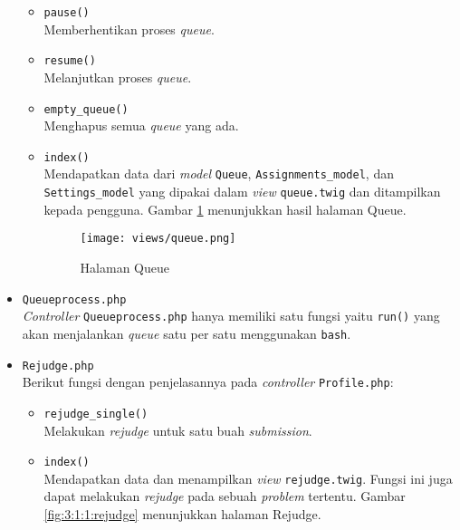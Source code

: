 \begin{itemize}
	      \begin{itemize}
		      \item \verb|pause()| \\
		            Memberhentikan proses \textit{queue}.
		      \item \verb|resume()| \\
		            Melanjutkan proses \textit{queue}.
		      \item \verb|empty_queue()| \\
		            Menghapus semua \textit{queue} yang ada.
		      \item \verb|index()| \\
		            Mendapatkan data dari \textit{model} \verb|Queue|, \verb|Assignments_model|, dan \verb|Settings_model| yang dipakai dalam \textit{view} \verb|queue.twig| dan ditampilkan kepada pengguna. Gambar \ref{fig:3:1:1:queue} menunjukkan hasil halaman Queue.

		            \begin{figure}[H]
			            \centering
			            \texttt{[image: views/queue.png]}
			            \caption{Halaman Queue}
			            \label{fig:3:1:1:queue}
		            \end{figure}

	      \end{itemize}

	\item \verb|Queueprocess.php| \\
	      \textit{Controller} \verb|Queueprocess.php| hanya memiliki satu fungsi yaitu \verb|run()| yang akan menjalankan \textit{queue} satu per satu menggunakan \verb|bash|.

	\item \verb|Rejudge.php| \\
	      Berikut fungsi dengan penjelasannya pada \textit{controller} \verb|Profile.php|:

	      \begin{itemize}
		      \item \verb|rejudge_single()| \\
		            Melakukan \textit{rejudge} untuk satu buah \textit{submission}.
		      \item \verb|index()| \\
		            Mendapatkan data dan menampilkan \textit{view} \verb|rejudge.twig|. Fungsi ini juga dapat melakukan \textit{rejudge} pada sebuah \textit{problem} tertentu. Gambar \ref{fig:3:1:1:rejudge} menunjukkan halaman Rejudge.


\end{itemize}
\end{itemize}
